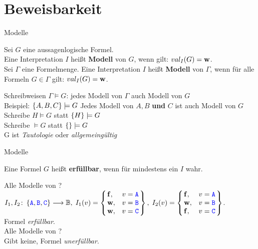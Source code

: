 \section{Beweisbarkeit}

\begin{frame}{Modelle}
	\begin{Definition}
		Sei $G$ eine aussagenlogische Formel. \\
		Eine Interpretation $I$ heißt \textbf{Modell} von $G$, wenn gilt: \quad $val_I(G) = \hbox{\textbf{w}}$. \\
		\pause
		\medskip
		Sei $\Gamma$ eine Formelmenge.
		Eine Interpretation $I$ heißt \textbf{Modell} von $\Gamma$, wenn für alle Formeln $G \in  \Gamma$ gilt: \quad $val_I(G) = \hbox{\textbf{w}}$.
	\end{Definition}
	\pause
	\begin{block}{Schreibweisen}
		$\Gamma \models G$: jedes Modell von $\Gamma$ auch Modell von $G$ \\
		Beispiel: \quad $\left\{A,B,C\right\} \models G$ \quad Jedes Modell von $A, B$ \textbf{und} $C$ ist auch Modell von $G$ \\
		\medskip
		Schreibe $H \models G$ statt $\left\{H\right\} \models G$ \\
		\medskip
		Schreibe $\models G$ statt $\left\{\right\} \models G$ \\
		\impl G ist \emph{Tautologie} oder \emph{allgemeingültig} 
	\end{block}
\end{frame}

\begin{frame}{Modelle}
	\begin{Definition}
		Eine Formel $G$ heißt \textbf{erfüllbar}, wenn für mindestens ein $I$ wahr. \\
		
	\end{Definition}
	\pause
	\begin{Beispiel}
		Alle Modelle von \mword{(C \boder \bnot C) \bimp \left(\bnot(B \bimp A)\right)}? \\
		\pause
		\impl $I_1, I_2 \from \set{\word A, \word B, \word C} \functionto \BB, \; 
		I_1(v) = 
		\caseslr{\F, & v = \word A \\
				\W, & v = \word B \\
				\W, & v = \word C}, \;
		I_2(v) = 
		\caseslr{\F, & v = \word A \\
				\W, & v = \word B \\
				\F, & v = \word C}$. \\
		\impl Formel \emph{erfüllbar}. \\
		\pause
		\medskip
		Alle Modelle von \mword{\bnot(C \bimp C)}? \\
		\pause
		\impl Gibt keine, Formel \emph{unerfüllbar}.
	\end{Beispiel}
\end{frame}

